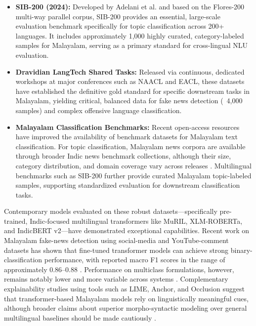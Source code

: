 \documentclass[12pt]{article}
\begin{document}
\begin{itemize}
\item \textbf{SIB-200 (2024):} Developed by Adelani et al. and based on the Flores-200 multi-way parallel corpus, SIB-200 provides an essential, large-scale evaluation benchmark specifically for topic classification across 200+ languages. It includes approximately 1,000 highly curated, category-labeled samples for Malayalam, serving as a primary standard for cross-lingual NLU evaluation. \cite{adelani2023sib200}

\item \textbf{Dravidian LangTech Shared Tasks:} Released via continuous, dedicated workshops at major conferences such as NAACL and EACL, these datasets have established the definitive gold standard for specific downstream tasks in Malayalam, yielding critical, balanced data for fake news detection (~4,000 samples)\cite{farsi2024dravidian_fakenews_dataset} and complex offensive language classification.\cite{dravidianlangtech2024_fakenews} 

\item \textbf{Malayalam Classification Benchmarks:} Recent open-access resources have improved the availability of benchmark datasets for Malayalam text classification. For topic classification, Malayalam news corpora are available through broader Indic news benchmark collections, although their size, category distribution, and domain coverage vary across releases \cite{palanikumar2024l3cubeindicnews}. Multilingual benchmarks such as SIB-200 further provide curated Malayalam topic-labeled samples, supporting standardized evaluation for downstream classification tasks.
\end{itemize}
Contemporary models evaluated on these robust datasets—specifically pre-trained, Indic-focused multilingual transformers like MuRIL, XLM-ROBERTa, and IndicBERT v2—have demonstrated exceptional capabilities. Recent work on Malayalam fake-news detection using social-media and YouTube-comment datasets has shown that fine-tuned transformer models can achieve strong binary-classification performance, with reported macro F1 scores in the range of approximately 0.86--0.88 \cite{bala2023focalloss,jaff2024malayalambert}. Performance on multiclass formulations, however, remains notably lower and more variable across systems \cite{ansar2024finetuned}. Complementary explainability studies using tools such as LIME, Anchor, and Occlusion suggest that transformer-based Malayalam models rely on linguistically meaningful cues, although broader claims about superior morpho-syntactic modeling over general multilingual baselines should be made cautiously \cite{likha2025fakenews}.
\end{document}
